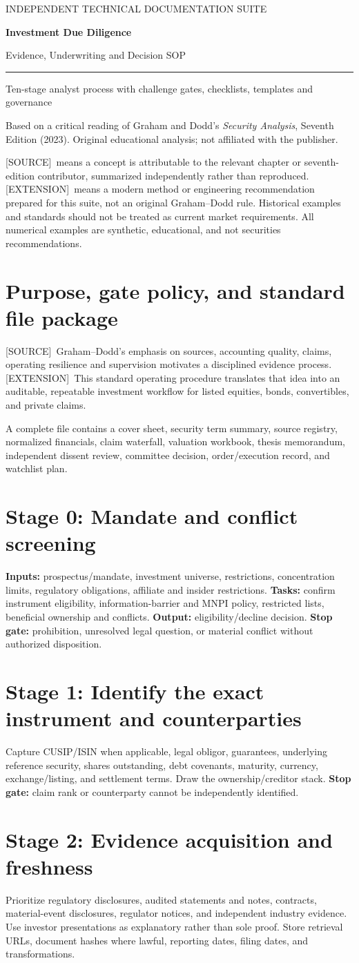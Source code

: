 \documentclass[11pt,letterpaper]{article}
\newcommand{\src}{\textsf{\color{sea}[SOURCE]}}
\newcommand{\ext}{\textsf{\color{gold}[EXTENSION]}}
\newcommand{\cover}[3]{%
\hypersetup{pageanchor=false}%
\begin{titlepage}\pagecolor{ink}\color{white}\vspace*{1.15in}
{\sffamily\large\color{gold}INDEPENDENT TECHNICAL DOCUMENTATION SUITE\par}\vspace{0.4in}
{\Huge\sffamily\bfseries #1\par}\vspace{0.15in}
{\Large\sffamily #2\par}\vspace{0.65in}
\color{gold}\rule{\textwidth}{2pt}\par\vspace{0.4in}
{\large #3\par}\vfill
{\small\sffamily Based on a critical reading of Graham and Dodd's \emph{Security Analysis}, Seventh Edition (2023). Original educational analysis; not affiliated with the publisher.\par}
\end{titlepage}\hypersetup{pageanchor=true}\nopagecolor\color{black}}
\newcommand{\front}[3]{\cover{#1}{#2}{#3}\tableofcontents\clearpage
\begin{sourcebox}\src\ means a concept is attributable to the relevant chapter or seventh-edition contributor, summarized independently rather than reproduced. \ext\ means a modern method or engineering recommendation prepared for this suite, not an original Graham--Dodd rule. Historical examples and standards should not be treated as current market requirements. All numerical examples are synthetic, educational, and not securities recommendations.\end{sourcebox}}
\begin{document}
\front{Investment Due Diligence}{Evidence, Underwriting and Decision SOP}{Ten-stage analyst process with challenge gates, checklists, templates and governance}

\section{Purpose, gate policy, and standard file package}
\src\ Graham--Dodd's emphasis on sources, accounting quality, claims, operating resilience and supervision motivates a disciplined evidence process. \ext\ This standard operating procedure translates that idea into an auditable, repeatable investment workflow for listed equities, bonds, convertibles, and private claims.

A complete file contains a cover sheet, security term summary, source registry, normalized financials, claim waterfall, valuation workbook, thesis memorandum, independent dissent review, committee decision, order/execution record, and watchlist plan.

\section{Stage 0: Mandate and conflict screening}
\textbf{Inputs:} prospectus/mandate, investment universe, restrictions, concentration limits, regulatory obligations, affiliate and insider restrictions. \textbf{Tasks:} confirm instrument eligibility, information-barrier and MNPI policy, restricted lists, beneficial ownership and conflicts. \textbf{Output:} eligibility/decline decision. \textbf{Stop gate:} prohibition, unresolved legal question, or material conflict without authorized disposition.

\section{Stage 1: Identify the exact instrument and counterparties}
Capture CUSIP/ISIN when applicable, legal obligor, guarantees, underlying reference security, shares outstanding, debt covenants, maturity, currency, exchange/listing, and settlement terms. Draw the ownership/creditor stack. \textbf{Stop gate:} claim rank or counterparty cannot be independently identified.

\section{Stage 2: Evidence acquisition and freshness}
Prioritize regulatory disclosures, audited statements and notes, contracts, material-event disclosures, regulator notices, and independent industry evidence. Use investor presentations as explanatory rather than sole proof. Store retrieval URLs, document hashes where lawful, reporting dates, filing dates, and transformations.
\end{document}
